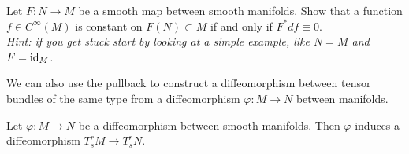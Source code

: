 \begin{exercise}
  Let $F:N\to M$ be a smooth map between smooth manifolds.
  Show that a function $f\in C^\infty(M)$ is constant on $F(N)\subset M$ if and only if $F^* df \equiv 0$.\\
  \textit{\small Hint: if you get stuck start by looking at a simple example, like $N=M$ and $F=\operatorname{id}_M$.}
\end{exercise}

We can also use the pullback to construct a diffeomorphism between tensor bundles of the same type from a diffeomorphism $\varphi:M\to N$ between manifolds.

\begin{proposition}
  Let $\varphi:M\to N$ be a diffeomorphism between smooth manifolds.
  Then $\varphi$ induces a diffeomorphism $T_s^rM \to T_s^r N$.
\end{proposition}
